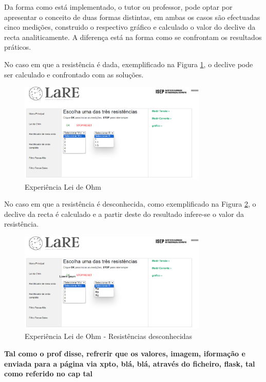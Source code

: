 Da forma como está implementado, o tutor ou professor, pode optar por apresentar o conceito de duas formas distintas, em ambas os casos são efectuadas cinco medições, construido o respectivo gráfico e calculado o valor do declive da recta analiticamente. A diferença está na forma como se confrontam os resultados práticos. 

No caso em que a resistência é dada, exemplificado na Figura \ref{fig:pagohm}, o declive pode ser calculado e confrontado com as soluções.

\begin{figure}[hbtp]
	\centering
	\includegraphics[width=0.8\textwidth]{figures/ohm_escolha.png}
	\caption{Experiência Lei de Ohm}
	\label{fig:pagohm}
\end{figure}

No caso em que a resistência é desconhecida, como exemplificado na Figura \ref{fig:pagohmabc}, o declive da recta é calculado e a partir deste do resultado infere-se o valor da resistência. 

\begin{figure}[hbtp]
	\centering
	\includegraphics[width=0.8\textwidth]{figures/ohm_escolha_abc.png}
	\caption{Experiência Lei de Ohm - Resistências desconhecidas}
	\label{fig:pagohmabc}
\end{figure}

\textbf{Tal como o prof disse, refrerir que os valores, imagem, iformação e enviada para a página via xpto, blá, blá, através do ficheiro, flask, tal como referido no cap tal}

